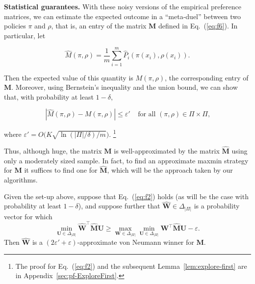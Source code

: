  {\bf Statistical guarantees.} With these noisy versions of the empirical preference matrices, we can estimate the expected outcome in a ``meta-duel'' between two policies
$\pi$ and $\rho$, that is, an entry of the matrix $\mathbf{M}$ defined in Eq.~(\ref{eq:f6}).
In particular, let

\begin{equation} \label{eq:f3}
 {\hat{M}({\pi},{\rho})} = \frac{1}{m}

             \sum_{i=1}^{m} {\hat{P}_i({\pi(x_i)},{\rho(x_i)})}.
\end{equation}

Then the expected value of this quantity is ${M({\pi},{\rho})}$, the corresponding entry of $\mathbf{M}$.
Moreover, using Bernstein's inequality and the union bound, we can show that, with probability at least $1-\delta$,

\begin{equation}  \label{eq:f2}
   {\left|{{\hat{M}({\pi},{\rho})} - {M({\pi},{\rho})}}\right|} \leq \varepsilon'
   \;\;\;\;\mbox{for all $(\pi,\rho)\in\Pi\times\Pi$,}
\end{equation}

where
$\varepsilon' =
    O\bigl(K
        \sqrt{{\ln({|\Pi|}/\delta)}/{m}}\bigr)
$.
\footnote{The proof for Eq.~(\ref{eq:f2}) and the subsequent Lemma~\ref{lem:explore-first} are in Appendix~\ref{sec:pf-ExploreFirst}.}

Thus, although huge, the matrix $\mathbf{M}$ is well-approximated by the matrix $\mathbf{\hat{M}}$ using only a moderately sized sample. In fact, to find an approximate maxmin strategy for $\mathbf{M}$ it suffices to find one for $\mathbf{\hat{M}}$,
which will be the approach taken by our algorithms.

\begin{lemma}
\label{lem:explore-first}
Given the set-up above, suppose that Eq.~(\ref{eq:f2}) holds (as will be the case with probability at least
$1-\delta$), and suppose further that
$\mathbf{\hat{W}}\in{\Delta_{{|\Pi|}}}$ is a probability vector for which
\[
\min_{\mathbf{U}\in{\Delta_{{|\Pi|}}}} {\mathbf{\hat{W}}^{\top}} \mathbf{\hat{M}} \mathbf{U}
 \geq
\max_{\mathbf{W}\in{\Delta_{{|\Pi|}}}} \min_{\mathbf{U}\in{\Delta_{{|\Pi|}}}} {\mathbf{W}^{\top}} \mathbf{\hat{M}} \mathbf{U}
- \varepsilon.
\]
Then $\mathbf{\hat{W}}$ is a $(2\varepsilon' + \varepsilon)$-approximate von Neumann winner for $\mathbf{M}$.

\end{lemma}

